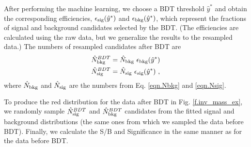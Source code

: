 After performing the machine learning, we choose a BDT threshold $\hat{y}^*$ and obtain the corresponding efficiencies, $\epsilon_{\rm sig}(\hat{y}^*)$ and $\epsilon_{\rm bkg}(\hat{y}^*)$, which represent the fractions of signal and background candidates selected by the BDT. (The efficiencies are calculated using the raw data, but we generalize the results to the resampled data.) The numbers of resampled candidates after BDT are
\begin{align}
    \hat{N}^{BDT}_{\rm bkg} &= \hat{N}_{\rm bkg} \ \epsilon_{\rm bkg}(\hat{y}^*) \\
    \hat{N}^{BDT}_{\rm sig} &= \hat{N}_{\rm sig} \ \epsilon_{\rm sig}(\hat{y}^*)  \ ,
\end{align}
where $\hat{N}_{\rm bkg}$ and $\hat{N}_{\rm sig}$ are the numbers from Eq. \eqref{eqn.Nbkg} and \eqref{eqn.Nsig}.

To produce the red distribution for the data after BDT in Fig. \ref{f.inv_mass_ex}, we randomly sample $\hat{N}^{BDT}_{\rm sig}$ and $\hat{N}^{BDT}_{\rm bkg}$ candidates from the fitted signal and background distributions (the same ones from which we sampled the data before BDT). Finally, we calculate the S/B and Significance in the same manner as for the data before BDT.
